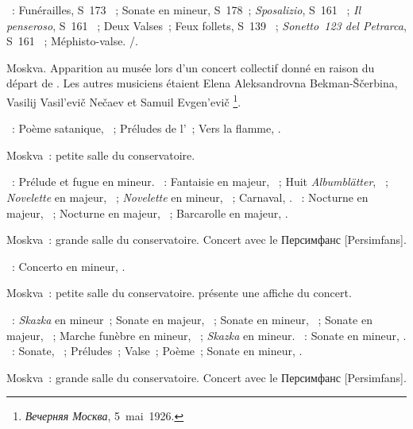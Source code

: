 \begin{description}
 \textsc{\Liszt{}}~: Funérailles, S~173 ~; Sonate en \kB mineur,
 S~178~; \emph{Sposalizio}, S~161 ~; \emph{Il penseroso}, S~161
 ~; Deux Valses~; Feux follets, S~139 ~;
 \emph{Sonetto~123 del Petrarca}, S~161 ~; Méphisto-valse.
 \textsc{\Schubert{}/\Liszt{}}.
 \item[\DateWithWeekDay{1926-05-08}]
 Moskva.
 Apparition au musée \Scriabine{} lors d'un concert collectif donné en
 raison du départ de \HNeuhaus{} \citep[voir][]{Lazarev20}.
 Les autres musiciens étaient Elena Aleksandrovna Bekman-Ščerbina, Vasilij
 Vasil'evič Nečaev et Samuil Evgen'evič \Feinberg{}%
 \footnote{\foreignlanguage{russian}{\emph{Вечерняя Москва}}, 5~mai~1926.}.

 \textsc{\Scriabine{}}~: Poème satanique, ~; Préludes de
 l'~; Vers la flamme, .
 \item[\DateWithWeekDay{1926-10-31}]
 Moskva~: petite salle du conservatoire.

 \textsc{\JBach{}}~: Prélude et fugue en \kB \Flat mineur.
 \textsc{\Schumann{}}~: Fantaisie en \kC majeur, ~; Huit
 \emph{Albumblätter}, ~; \emph{Novelette} en \kE majeur, 
 ~; \emph{Novelette} en \kF \Sharp mineur,  ~;
 Carnaval, .
 \textsc{\Chopin{}}~: Nocturne en \kF majeur,  ~;
 Nocturne en \kF \Sharp majeur,  ~; Barcarolle en \kF
 \Sharp majeur, .
 \item[\DateWithWeekDay{1926-11-01}]
 Moskva~: grande salle du conservatoire.
 Concert avec le \foreignlanguage{russian}{Персимфанс}
 [Persimfans].

 \textsc{\Glazounov{}}~: Concerto en \kF mineur, .
 \item[\DateWithWeekDay{1926-11-06}]
 Moskva~: petite salle du conservatoire.
 \citet{Lazarev20} présente une affiche du concert.

 \textsc{\Medtner{}}~: \emph{Skazka} en \kF mineur~; Sonate en \kA \Flat
 majeur,  ~; Sonate en \kD mineur,  ~;
 Sonate en \kC majeur,  ~; Marche funèbre en \kB mineur,
  ~; \emph{Skazka} en \kB mineur.
 \textsc{\Prokofiev{}}~: Sonate en \kA mineur, .
 \textsc{\Scriabine{}}~: Sonate, ~; Préludes~; Valse~; Poème~;
 Sonate en \kF mineur, .
 \item[\DateWithWeekDay{1926-11-08}]
 Moskva~: grande salle du conservatoire.
 Concert avec le \foreignlanguage{russian}{Персимфанс}
 [Persimfans].


\end{description}

